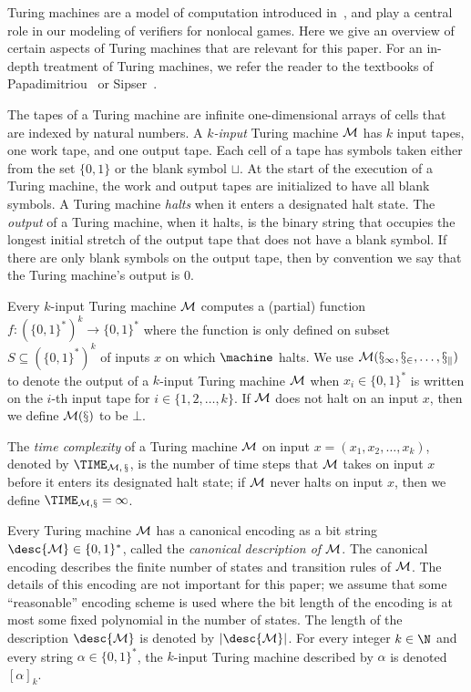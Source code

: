 Turing machines are a model of computation introduced
in~\cite{turing1937computable}, and play a central role in our modeling of verifiers for nonlocal
games. Here we give an overview of certain aspects of Turing machines that are relevant for
this paper. For an in-depth treatment of Turing machines, we refer the reader to the textbooks of 
Papadimitriou~\cite{Pap94} or Sipser~\cite{sipser2012introduction}.

The tapes of a Turing machine are infinite one-dimensional arrays of cells that
are indexed by natural numbers.
A \emph{$k$-input} Turing machine $\cal{M}$ has $k$ input tapes, one work tape,
and one output tape. 
Each cell of a tape has symbols taken either from the set $\{0,1\}$ or the blank
symbol $\sqcup$.
At the start of the execution of a Turing machine, the work and output tapes are
initialized to have all blank symbols.
A Turing machine \emph{halts} when it enters a designated halt state.
The \emph{output} of a Turing machine, when it halts, is the binary string that
occupies the longest initial stretch of the output tape that does not have a
blank symbol.
If there are only blank symbols on the output tape, then by convention we say
that the Turing machine's output is $0$.

Every $k$-input Turing machine $\cal{M}$ computes a (partial) function $f: (\{0,
1\}^*)^k \to \{0,1\}^*$ where the function is only defined on subset $S
\subseteq (\{0,1\}^*)^k$ of inputs $x$ on which $\machine$ halts.
We use $\cal{M}(x_1, x_2, \ldots, x_k)$ to denote the output of a $k$-input
Turing machine $\cal{M}$ when $x_i \in \{0,1\}^*$ is written on the $i$-th input
tape for $i \in \{1, 2, \ldots, k\}$.
If $\cal{M}$ does not halt on an input $x$, then we define $\cal{M}(x)$ to be
$\bot$.


The \emph{time complexity} of a Turing machine $\cal{M}$ on input $x = (x_1,
x_2, \ldots, x_k)$, denoted by $\TIME_{\cal{M},\, x}$, is the number of time
steps that $\cal{M}$ takes on input $x$ before it enters its designated halt
state; if $\cal{M}$ never halts on input $x$, then we define $\TIME_{\cal{M},x}
= \infty$.

Every Turing machine $\cal{M}$ has a canonical encoding as a bit string $\desc{\cal{M}} \in \{0, 1\}^*$, called
the \emph{canonical description of $\cal{M}$}. The canonical encoding describes the 
finite number of states and transition rules of $\cal{M}$. The details of this 
encoding are not important for this paper; we assume that some ``reasonable'' encoding scheme is
used where the bit length of the encoding is at most some fixed polynomial in the number of 
states. The length of the description
$\desc{\cal{M}}$ is denoted by $|\desc{\cal{M}}|$. 
For every integer $k \in \N$ and every string $\alpha \in \{0, 1\}^*$, the
$k$-input Turing machine described by $\alpha$ is denoted $[\alpha]_k$.

